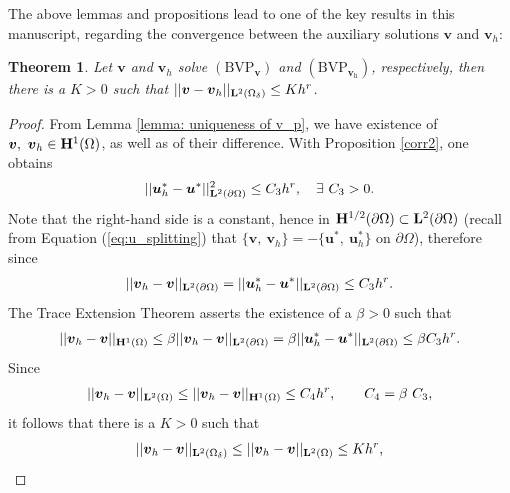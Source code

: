\documentclass[pdflatex,sn-mathphys-num]{sn-jnl}
\newtheorem{theorem}{Theorem}%
\newtheorem*{lemma star}{Lemma}
\begin{document}
The above lemmas and propositions lead to one of the key results in this manuscript, regarding the convergence between the auxiliary solutions $\boldsymbol{v}$ and $\boldsymbol{v}_h$:
\begin{theorem}
\label{Th_v_v_h}
    Let $\boldsymbol{v}$ and $\boldsymbol{v}_h$ solve $\mathrm{(BVP_{\boldsymbol v})}$ and $\mathrm{(BVP_{{\boldsymbol v}_h})}$, respectively, then there is a $K > 0$ such that $|| \boldsymbol{v} - \boldsymbol{v}_h ||_{{\bf L}^2(\Omega_\delta)} \le K h^{r}$.
\end{theorem}
\begin{proof}
From Lemma \ref{lemma: uniqueness of v_p}, we have existence of $\boldsymbol{v},~\boldsymbol{v}_h \in {\bf H}^1(\Omega)$, as well as of their difference. With Proposition \ref{corr2}, one obtains
\begin{align*}
||{\boldsymbol u}_h^* - {\boldsymbol u}^* ||^2_{{\bf L}^2(\partial \Omega)}\le C_3h^{r}, \quad \exists ~ C_3 > 0.
\end{align*}
Note that the right-hand side is a constant, hence in ${\bf H}^{1/2}(\partial \Omega) \subset {\bf L}^2(\partial \Omega)$ (recall from Equation (\ref{eq:u_splitting}) that $\{\boldsymbol{v},~\boldsymbol{v}_h\}=-\{\boldsymbol{u}^*,~\boldsymbol{u}_h^*\}$ on $\partial \Omega$), therefore
since
\begin{align*}
||{\boldsymbol v}_h - {\boldsymbol v} ||_{{\bf L}^2(\partial\Omega)}= 
|| {\boldsymbol u}_h^* - {\boldsymbol u}^* ||_{{\bf L}^2(\partial\Omega)} \le C_3h^{r}.
\end{align*}
The Trace Extension Theorem \citep{adams2003sobolev}
asserts the existence of a $\beta > 0$ such that
\begin{align*}
|| {\boldsymbol v}_h - {\boldsymbol v} ||_{{\bf H}^1(\Omega)} \le \beta
|| {\boldsymbol v}_h - {\boldsymbol v} ||_{{\bf L}^2(\partial \Omega)} = \beta
|| {\boldsymbol u}_h^* - {\boldsymbol u}^* ||_{{\bf L}^2(\partial \Omega)} \le \beta C_3h^{r}.
\end{align*}
Since
\begin{align*}
|| {\boldsymbol v}_h - {\boldsymbol v} ||_{{\bf L}^2(\Omega)} \le || {\boldsymbol v}_h - {\boldsymbol v} ||_{{\bf H}^1(\Omega)} \le C_4 h^{r}, \qquad C_4 = \beta ~ C_3,
\end{align*}
it follows that
there is a $K>0$ such that
\begin{align}
|| {\boldsymbol v}_h - {\boldsymbol v} ||_{{\bf L}^2(\Omega_\delta)} \le || {\boldsymbol v}_h - {\boldsymbol v} ||_{{\bf L}^2(\Omega)} \le K h^{r},
\label{two}
\end{align}
 \end{proof}
\end{document}
